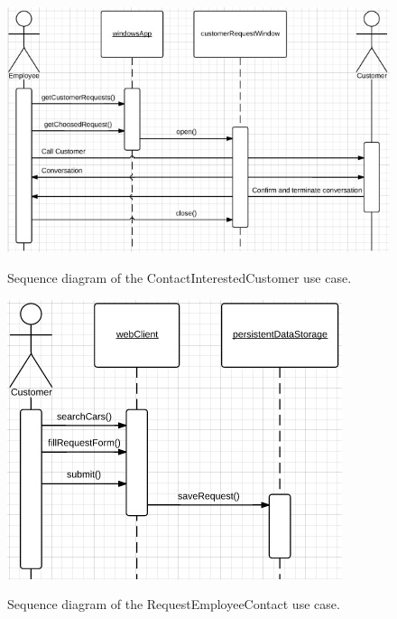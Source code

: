 \begin{figure}[h!]
	\centering
		\includegraphics[scale=0.8]{Figures/SequenceDiagram-ContactInterestedCustomer}\\
	\caption{Sequence diagram of the ContactInterestedCustomer use case.}
  \label{fig:SequenceDiagram-ContactInterestedCustomer}
\end{figure}
\begin{figure}[h!]
	\centering
		\includegraphics[scale=0.8]{Figures/SequenceDiagram-RequestEmployeeContact}\\
	\caption{Sequence diagram of the RequestEmployeeContact use case.}
  \label{fig:SequenceDiagram-RequestEmployeeContact}
\end{figure}

